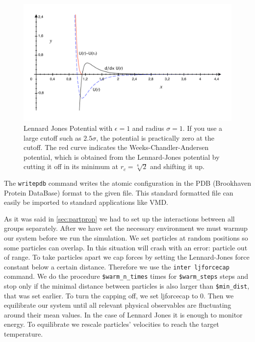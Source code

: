 \documentclass[
paper=a4,                       %
fontsize=11pt,                  %
twoside,                        %
footsepline,                    %
headsepline,                    %
headinclude=false,              %
footinclude=false,              %
pagesize,                       %
]{scrartcl}
\begin{document}
\begin{figure}[ht]
\begin{center}
\includegraphics[width=12cm]{figures/lennard-jones-potential.pdf}
\caption[long text]{Lennard Jones Potential with
  $\epsilon=1$ and radius $\sigma=1$. If you use a large cutoff such as
  $2.5\sigma$, the potential is practically zero at the cutoff. The
  red curve indicates the Weeks-Chandler-Andersen potential, which
  is obtained from the Lennard-Jones potential by cutting it off in
  its minimum at $r_c=\sqrt[6]{2}$ and shifting it up.}
\label{pic:lennard-jones}
\end{center}
\end{figure}

\noindent 
The \lstinline|writepdb| command writes the atomic configuration in the PDB (Brookhaven Protein DataBase) format to the given file. This standard formatted file can easily be imported to standard applications like VMD. 

As it was said in \ref{sec:partprop} we had to set up the interactions between all groups separately. 
After we have set the necessary environment we must warmup our system before we run the simulation. We set 
particles at random positions so some particles can overlap. In this situation \es  will crash with an error:
particle out of range. To take particles apart 
we cap forces  by setting the Lennard-Jones force constant below a certain distance. 
Therefore we use the \lstinline|inter ljforcecap| command. We do the procedure  \verb"$warm_n_times" times 
for \verb"$warm_steps" steps and stop only if the minimal distance between particles is also larger than 
\verb"$min_dist", that was set earlier.  To turn 
the capping off, we set ljforcecap to 0. Then  we equilibrate our system until all relevant physical observables
are fluctuating around their mean values. In the case of Lennard Jones it is enough to monitor energy. 
To equilibrate we rescale particles' velocities to reach the target temperature.
\end{document}
